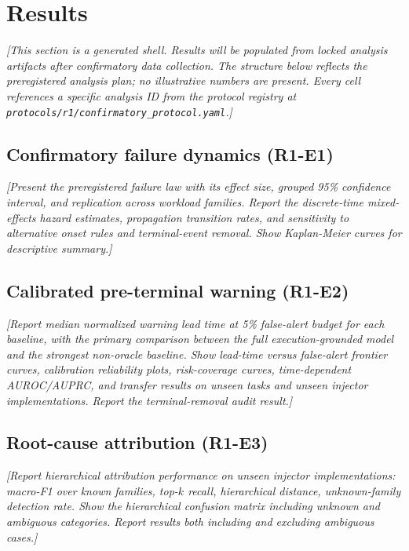 \section{Results}
\label{sec:results}

\textit{[This section is a generated shell. Results will be populated from
locked analysis artifacts after confirmatory data collection. The structure
below reflects the preregistered analysis plan; no illustrative numbers are
present. Every cell references a specific analysis ID from the protocol
registry at \texttt{protocols/r1/confirmatory\_protocol.yaml}.]}

\subsection{Confirmatory failure dynamics (R1-E1)}

\textit{[Present the preregistered failure law with its effect size,
grouped 95\% confidence interval, and replication across workload families.
Report the discrete-time mixed-effects hazard estimates, propagation
transition rates, and sensitivity to alternative onset rules and
terminal-event removal. Show Kaplan-Meier curves for descriptive summary.]}

\subsection{Calibrated pre-terminal warning (R1-E2)}

\textit{[Report median normalized warning lead time at 5\% false-alert
budget for each baseline, with the primary comparison between the
full execution-grounded model and the strongest non-oracle baseline.
Show lead-time versus false-alert frontier curves, calibration reliability
plots, risk-coverage curves, time-dependent AUROC/AUPRC, and transfer
results on unseen tasks and unseen injector implementations.
Report the terminal-removal audit result.]}

\subsection{Root-cause attribution (R1-E3)}

\textit{[Report hierarchical attribution performance on unseen injector
implementations: macro-F1 over known families, top-$k$ recall,
hierarchical distance, unknown-family detection rate. Show the
hierarchical confusion matrix including unknown and ambiguous categories.
Report results both including and excluding ambiguous cases.]}

